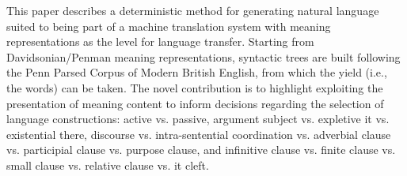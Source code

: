 This paper describes a deterministic method for generating natural language suited to being part of a machine translation system with meaning representations as the level for language transfer. Starting from Davidsonian/Penman meaning representations, syntactic trees are built following the Penn Parsed Corpus of Modern British English, from which the yield (i.e., the words) can be taken. The novel contribution is to highlight exploiting the presentation of meaning content to inform decisions regarding the selection of language constructions: active vs. passive, argument subject vs. expletive it vs. existential there, discourse vs. intra-sentential coordination vs. adverbial clause vs. participial clause vs. purpose clause, and infinitive clause vs. finite clause vs. small clause vs. relative clause vs. it cleft.
